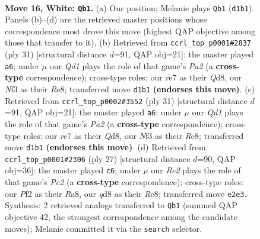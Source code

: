 \documentclass[11pt]{article}
\begin{document}
\clearpage

\begin{figure}[p]\centering
\begin{subfigure}{0.46\textwidth}\centering
\resizebox{\linewidth}{!}{%
\newchessgame
\chessboard[
  setfen={r2q1b2/1bp1rppk/p1np3p/1p1Bp3/4P3/P2P1N1P/1PPBRPP1/R2Q2K1 w - - 3 16},
  showmover=false,
  pgfstyle=straightmove, color=movearrow, markmove={d1-b1}
]}
\caption{}
\end{subfigure}\hfill
\begin{subfigure}{0.46\textwidth}\centering
\resizebox{\linewidth}{!}{%
\newchessgame
\chessboard[
  setfen={r1bqr1k1/p4p1p/1p1p2p1/2pPb3/Pn2P3/2N1BP2/1P1QB1PP/R4RK1 b - - 1 16},
  showmover=false,
  pgfstyle=straightmove, color=movearrow, markmove={a7-a6}
]}
\caption{}
\end{subfigure}
\\[4pt]
\begin{subfigure}{0.46\textwidth}\centering
\resizebox{\linewidth}{!}{%
\newchessgame
\chessboard[
  setfen={r1bqr1k1/p4p1p/1p1p2p1/2pPb3/Pn2P3/2N1BP2/1P1QB1PP/R4RK1 b - - 1 16},
  showmover=false,
  pgfstyle=straightmove, color=movearrow, markmove={a7-a6}
]}
\caption{}
\end{subfigure}\hfill
\begin{subfigure}{0.46\textwidth}\centering
\resizebox{\linewidth}{!}{%
\newchessgame
\chessboard[
  setfen={r2qr1k1/1ppb1pp1/3p1n1p/p3p3/P1PbP3/2NP2PP/1P3PBK/R1BQ1R2 b - - 0 14},
  showmover=false,
  pgfstyle=straightmove, color=movearrow, markmove={c7-c6}
]}
\caption{}
\end{subfigure}
\caption{\textbf{Move 16, White: \texttt{Qb1}.} (a) Our position; Melanie plays \texttt{Qb1} (\texttt{d1b1}). Panels (b)--(d) are the retrieved master positions whose correspondence most drove this move (highest QAP objective among those that transfer to it). (b) Retrieved from \texttt{ccrl\_top\_p0001\#2837} (ply 31) [structural distance $d$=91, QAP obj=21]: the master played \texttt{a6}; under $\mu$ our \emph{Qd1} plays the role of that game's \emph{Pa2} (a \textbf{cross-type} correspondence); cross-type roles: our \emph{r}e7 as their \emph{Q}d8, our \emph{N}f3 as their \emph{R}e8; transferred move \texttt{d1b1} \textbf{(endorses this move)}. (c) Retrieved from \texttt{ccrl\_top\_p0002\#3552} (ply 31) [structural distance $d$=91, QAP obj=21]: the master played \texttt{a6}; under $\mu$ our \emph{Qd1} plays the role of that game's \emph{Pa2} (a \textbf{cross-type} correspondence); cross-type roles: our \emph{r}e7 as their \emph{Q}d8, our \emph{N}f3 as their \emph{R}e8; transferred move \texttt{d1b1} \textbf{(endorses this move)}. (d) Retrieved from \texttt{ccrl\_top\_p0001\#2306} (ply 27) [structural distance $d$=90, QAP obj=36]: the master played \texttt{c6}; under $\mu$ our \emph{Re2} plays the role of that game's \emph{Pc2} (a \textbf{cross-type} correspondence); cross-type roles: our \emph{P}f2 as their \emph{R}a8, our \emph{q}d8 as their \emph{R}e8; transferred move \texttt{e2e3}. Synthesis: 2 retrieved analogs transferred to \texttt{Qb1} (summed QAP objective 42, the strongest correspondence among the candidate moves); Melanie committed it via the \texttt{search} selector.}
\label{fig:thought-m30}
\end{figure}
\end{document}
